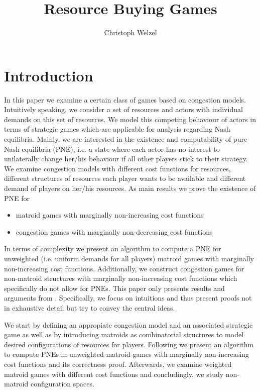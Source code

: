 \documentclass{scrartcl}
\title{Resource Buying Games}
\author{Christoph Welzel}
\theoremstyle{nonumberplain}
\begin{document}

\maketitle
\section{Introduction}
In this paper we examine a certain class of games based on congestion models.
Intuitively speaking, we consider a set of resources and actors with individual
demands on this set of resources. We model this competing behaviour of actors
in terms of strategic games which are applicable for analysis regarding
Nash equilibria. Mainly, we are interested in the existence and computability
of pure Nash equilibria (PNE), i.e. a state where each actor has no interest
to unilaterally change her/his behaviour if all other players stick to their
strategy. We examine congestion models with different cost functions for
resources, different structures of resources each player wants to be available
and different demand of players on her/his resources. As main results we prove
the existence of PNE for
\begin{itemize}
  \item matroid games with marginally non-increasing cost functions
  \item congestion games with marginally non-decreasing cost functions
\end{itemize}
In terms of complexity we present an algorithm to compute a PNE for unweighted
(i.e. uniform demands for all players) matroid games with marginally
non-increasing cost functions. Additionally, we construct congestion games for
non-matroid structures with marginally non-increasing cost functions which
specifically do not allow for PNEs. This paper only presents results and
arguments from \cite{main}. Specifically, we focus on intuitions and thus
present proofs not in exhaustive detail but try to convey the central ideas.

We start by defining an appropiate congestion model and an associated
strategic game as well as by introducing matroids as combinatorial structures
to model desired configurations of resources for players. Following we present
an algorithm to compute PNEs in unweighted matroid games with marginally
non-increasing cost functions and its correctness proof.
Afterwards, we examine weighted matroid games with different cost functions
and concludingly, we study non-matroid configuration spaces.
\end{document}
